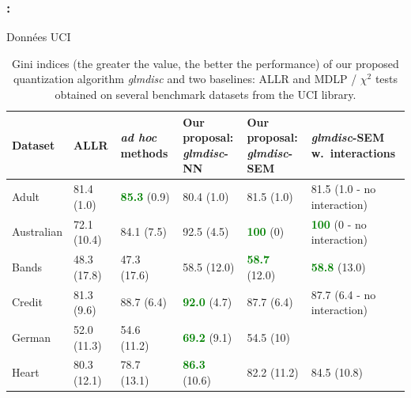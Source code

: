 \documentclass[english,xcolor={rgb,dvipsnames,table,usenames}]{beamer}
\begin{document}
\begin{frame}
\frametitle{\secname: \subsecname}

Données UCI

\begin{table}
    \centering
        \caption{Gini indices (the greater the value, the better the performance) of our proposed quantization algorithm \textit{glmdisc} and two baselines: ALLR and MDLP / $\chi^2$ tests obtained on several benchmark datasets from the UCI library.}
    \label{tab:banchmark_inter}
\begin{tiny}
\begin{tabular}{llllll}
Dataset & ALLR & \textit{ad hoc} methods & \makecell{Our proposal:\\ \textit{glmdisc}-NN} & \makecell{Our proposal:\\ \textit{glmdisc}-SEM} & \makecell{\textit{glmdisc}-SEM\\ w.\ interactions} \\
\hline
Adult & 81.4 (1.0) & \textcolor{green}{\textbf{85.3}} (0.9) & 80.4 (1.0) & 81.5 (1.0) & 81.5 (1.0 - no interaction) \\
Australian & 72.1 (10.4) & 84.1 (7.5) & 92.5 (4.5) & \textcolor{green}{\textbf{100}} (0) & \textcolor{green}{\textbf{100}} (0 - no interaction) \\
Bands & 48.3 (17.8) & 47.3 (17.6) & 58.5 (12.0) & \textcolor{green}{\textbf{58.7}} (12.0) & \textcolor{green}{\textbf{58.8}} (13.0) \\
Credit & 81.3 (9.6) & 88.7 (6.4) & \textcolor{green}{\textbf{92.0}} (4.7) & 87.7 (6.4) & 87.7 (6.4 - no interaction) \\
German & 52.0 (11.3) & 54.6 (11.2) & \textcolor{green}{\textbf{69.2}} (9.1) & 54.5 (10) &  \\
Heart & 80.3 (12.1) & 78.7 (13.1) & \textcolor{green}{\textbf{86.3}} (10.6) & 82.2 (11.2) & 84.5 (10.8)
\end{tabular}
\end{tiny}
\end{table}

\end{frame}
\end{document}
